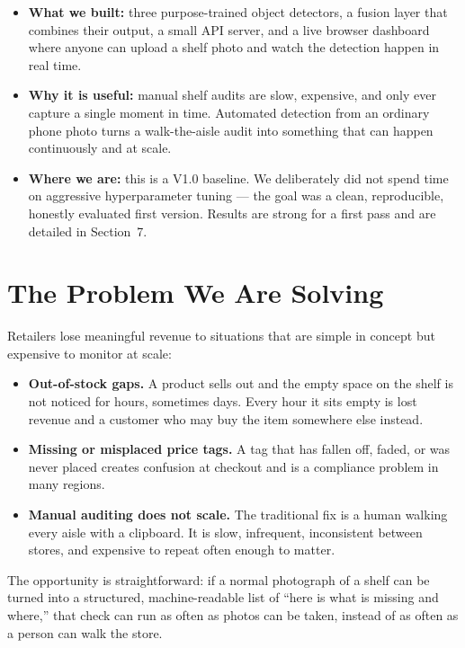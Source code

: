 \documentclass[11pt,a4paper]{article}
\begin{document}
\vspace{4pt}
\begin{itemize}
  \item \textbf{What we built:} three purpose-trained object detectors, a fusion layer that
        combines their output, a small API server, and a live browser dashboard where anyone can
        upload a shelf photo and watch the detection happen in real time.
  \item \textbf{Why it is useful:} manual shelf audits are slow, expensive, and only ever
        capture a single moment in time. Automated detection from an ordinary phone photo turns
        a walk-the-aisle audit into something that can happen continuously and at scale.
  \item \textbf{Where we are:} this is a V1.0 baseline. We deliberately did not spend time on
        aggressive hyperparameter tuning --- the goal was a clean, reproducible, honestly
        evaluated first version. Results are strong for a first pass and are detailed in
        Section~7.
\end{itemize}

\section{The Problem We Are Solving}

Retailers lose meaningful revenue to situations that are simple in concept but expensive to
monitor at scale:

\begin{itemize}
  \item \textbf{Out-of-stock gaps.} A product sells out and the empty space on the shelf is not
        noticed for hours, sometimes days. Every hour it sits empty is lost revenue and a
        customer who may buy the item somewhere else instead.
  \item \textbf{Missing or misplaced price tags.} A tag that has fallen off, faded, or was never
        placed creates confusion at checkout and is a compliance problem in many regions.
  \item \textbf{Manual auditing does not scale.} The traditional fix is a human walking every
        aisle with a clipboard. It is slow, infrequent, inconsistent between stores, and
        expensive to repeat often enough to matter.
\end{itemize}

The opportunity is straightforward: if a normal photograph of a shelf can be turned into a
structured, machine-readable list of ``here is what is missing and where,'' that check can run
as often as photos can be taken, instead of as often as a person can walk the store.
\end{document}
